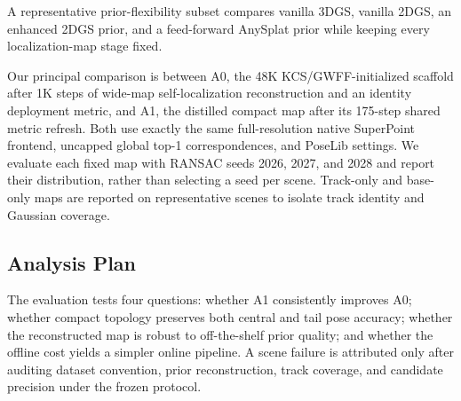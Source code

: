 A representative prior-flexibility subset compares vanilla 3DGS, vanilla
2DGS, an enhanced 2DGS prior, and a feed-forward AnySplat prior while keeping
every localization-map stage fixed.

Our principal comparison is between A0, the 48K KCS/GWFF-initialized scaffold
after 1K steps of wide-map self-localization reconstruction and an identity
deployment metric, and A1, the distilled compact map after its 175-step shared
metric refresh. Both use exactly the same full-resolution native SuperPoint frontend,
uncapped global top-1 correspondences, and PoseLib settings. We evaluate each
fixed map with RANSAC seeds 2026, 2027, and 2028 and report their distribution,
rather than selecting a seed per scene. Track-only and base-only maps are
reported on representative scenes to isolate track identity and Gaussian
coverage.



\subsection{Analysis Plan}

The evaluation tests four questions: whether A1 consistently improves A0;
whether compact topology preserves both central and tail pose accuracy; whether
the reconstructed map is robust to off-the-shelf prior quality; and whether the
offline cost yields a simpler online pipeline. A scene failure is attributed
only after auditing dataset convention, prior reconstruction, track coverage,
and candidate precision under the frozen protocol.
